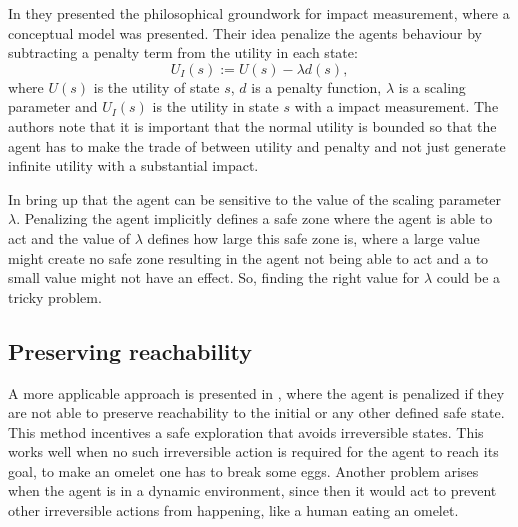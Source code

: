 \documentclass[12pt,A4]{report}
\theoremstyle{definition}
\begin{document}

In \autocite{Armstrong and Levinstein} they presented the philosophical groundwork for impact measurement, where a conceptual model was presented. Their idea penalize the agents behaviour by subtracting a penalty term from the utility in each state:
\[ U_I(s) := U(s) - \lambda d(s),\]
where $U(s)$ is the utility of state $s$, $d$ is a penalty function, $\lambda$ is a scaling parameter and $U_I(s)$ is the utility in state $s$ with a impact measurement. The authors note that it is important that the normal utility is bounded so that the agent has to make the trade of between utility and penalty and not just generate infinite utility with a substantial impact. 

 In \autocite{Armstrong and Levinstein} bring up that the agent can be sensitive to the value of the scaling parameter $\lambda$. Penalizing the agent implicitly defines a safe zone where the agent is able to act and the value of $\lambda$ defines how large this safe zone is, where a large value might create no safe zone resulting in the agent not being able to act and a to small value might not have an effect. So, finding the right value for $\lambda$ could be a tricky problem. 

\subsection{Preserving reachability}
A more applicable approach is presented in \autocite{Eysenbach et al}, where the agent is penalized if they are not able to preserve reachability to the initial or any other defined safe state. This method incentives a safe exploration that avoids irreversible states. This works well when no such irreversible action is required for the agent to reach its goal, to make an omelet one has to break some eggs. Another problem arises when the agent is in a dynamic environment, since then it would act to prevent other irreversible actions from happening, like a human eating an omelet. 
\end{document}
